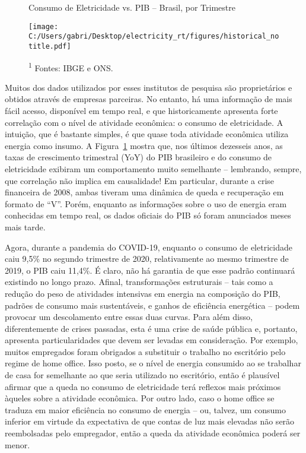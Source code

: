 \documentclass[12pt]{article}
\begin{document}
\begin{figure}[!bp]
	\centering
	\caption{Consumo de Eletricidade vs. PIB -- Brasil, por Trimestre}
	\label{fig:figure1}
	\texttt{[image: C:/Users/gabri/Desktop/electricity\_rt/figures/historical\_notitle.pdf]}	
	\caption*{\textsuperscript{1} Fontes: IBGE e ONS.}
\end{figure}
	
Muitos dos dados utilizados por esses institutos de pesquisa são proprietários e obtidos através de empresas parceiras. No entanto, há uma informação de mais fácil acesso, disponível em tempo real, e que historicamente apresenta forte correlação com o nível de atividade econômica: o consumo de eletricidade. A intuição, que é bastante simples, é que quase toda atividade econômica utiliza energia como insumo. A Figura~{\ref{fig:figure1}} mostra que, nos últimos dezesseis anos, as taxas de crescimento trimestral (YoY) do PIB brasileiro e do consumo de eletricidade exibiram um comportamento muito semelhante -- lembrando, sempre, que correlação não implica em causalidade! Em particular, durante a crise financeira de 2008, ambas tiveram uma dinâmica de queda e recuperação em formato de ``V''. Porém, enquanto as informações sobre o uso de energia eram conhecidas em tempo real, os dados oficiais do PIB só foram anunciados meses mais tarde. 

Agora, durante a pandemia do COVID-19, enquanto o consumo de eletricidade caiu 9,5\% no segundo trimestre de 2020, relativamente ao mesmo trimestre de 2019, o PIB caiu 11,4\%. É claro, não há garantia de que esse padrão continuará existindo no longo prazo. Afinal, transformações estruturais -- tais como a redução do peso de atividades intensivas em energia na composição do PIB, padrões de consumo mais sustentáveis, e ganhos de eficiência energética -- podem provocar um descolamento entre essas duas curvas. Para além disso, diferentemente de crises passadas, esta é uma crise de saúde pública e, portanto, apresenta particularidades que devem ser levadas em consideração. Por exemplo, muitos empregados foram obrigados a substituir o trabalho no escritório pelo regime de home office. Isso posto, se o nível de energia consumido ao se trabalhar de casa for semelhante ao que seria utilizado no escritório, então é plausível afirmar que a queda no consumo de eletricidade terá reflexos mais próximos àqueles sobre a atividade econômica. Por outro lado, caso o home office se traduza em maior eficiência no consumo de energia -- ou, talvez, um consumo inferior em virtude da expectativa de que contas de luz mais elevadas não serão reembolsadas pelo empregador, então a queda da atividade econômica poderá ser menor.
\end{document}
